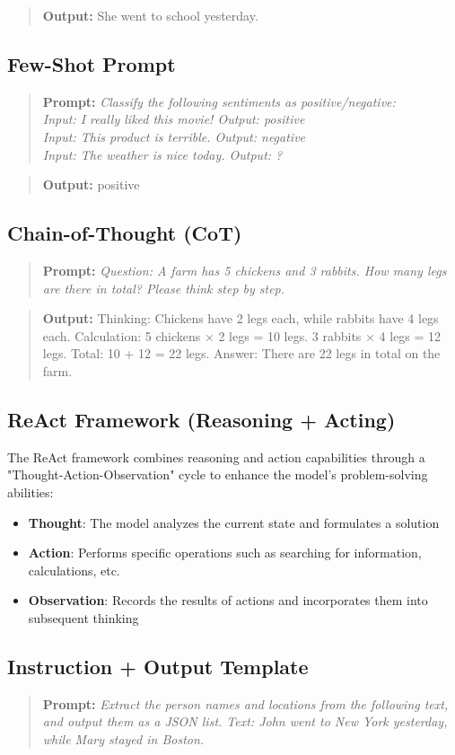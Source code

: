 \documentclass[12pt]{article}
\newcommand{\prompt}[1]{\begin{quote}\textbf{Prompt:} \textit{#1}\end{quote}}
\newcommand{\modeloutput}[1]{\begin{quote}\textbf{Output:} #1\end{quote}}
\begin{document}
\modeloutput{She went to school yesterday.}

\subsection{Few-Shot Prompt}
\prompt{Classify the following sentiments as positive/negative:\\
Input: I really liked this movie! Output: positive\\
Input: This product is terrible. Output: negative\\
Input: The weather is nice today. Output: ?}

\modeloutput{positive}

\subsection{Chain-of-Thought (CoT)}
\prompt{Question: A farm has 5 chickens and 3 rabbits. How many legs are there in total? Please think step by step.}

\modeloutput{Thinking: Chickens have 2 legs each, while rabbits have 4 legs each.
Calculation: 5 chickens × 2 legs = 10 legs. 3 rabbits × 4 legs = 12 legs.
Total: 10 + 12 = 22 legs.
Answer: There are 22 legs in total on the farm.}

\subsection{ReAct Framework (Reasoning + Acting)}
The ReAct framework combines reasoning and action capabilities through a "Thought-Action-Observation" cycle to enhance the model's problem-solving abilities:
\begin{itemize}
  \item \textbf{Thought}: The model analyzes the current state and formulates a solution
  \item \textbf{Action}: Performs specific operations such as searching for information, calculations, etc.
  \item \textbf{Observation}: Records the results of actions and incorporates them into subsequent thinking
\end{itemize}

\subsection{Instruction + Output Template}
\prompt{Extract the person names and locations from the following text, and output them as a JSON list.
Text: John went to New York yesterday, while Mary stayed in Boston.}
\end{document}

